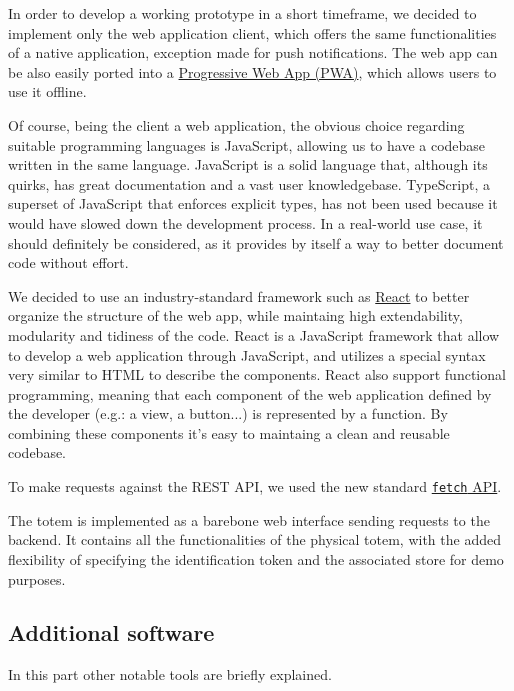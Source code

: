 \documentclass[
]{article}
\begin{document}
In order to develop a working prototype in a short timeframe, we decided
to implement only the web application client, which offers the same
functionalities of a native application, exception made for push
notifications. The web app can be also easily ported into a
\href{https://developer.mozilla.org/en-US/docs/Web/Progressive_web_apps}{Progressive
Web App (PWA)}, which allows users to use it offline.

Of course, being the client a web application, the obvious choice
regarding suitable programming languages is JavaScript, allowing us to
have a codebase written in the same language. JavaScript is a solid language that, although its quirks, has great documentation and a vast user knowledgebase. 
TypeScript, a superset of JavaScript that enforces explicit types, has not been used because it would have slowed down the development process. In a real-world use case, it should definitely be considered, as it provides by itself a way to better document code without effort.

We decided to use an industry-standard framework such as
\href{https://reactjs.org/}{React} to better organize the structure of
the web app, while maintaing high extendability, modularity and tidiness
of the code. React is a JavaScript framework that allow to develop a web application through JavaScript, and utilizes a special syntax very similar to HTML to describe the components. React also support functional programming, meaning that each component of the web application defined by the developer (e.g.: a view, a button...) is represented by a function. By combining these components it's easy to maintaing a clean and reusable codebase.

To make requests against the REST API, we used the
new standard
\href{https://developer.mozilla.org/en-US/docs/Web/API/Fetch_API}{\texttt{fetch}
API}.

The totem is implemented as a barebone web interface sending requests to the backend. It contains all the functionalities of the physical totem, with the added flexibility of specifying the identification token and the associated store for demo purposes.

\hypertarget{additional-software}{%
\subsection{Additional software}\label{additional-software}}

In this part other notable tools are briefly explained.
\end{document}
